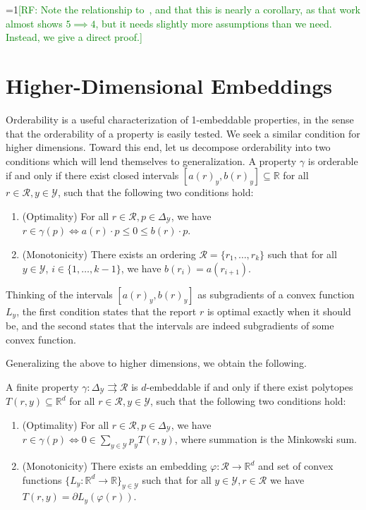 \documentclass[anon,12pt]{colt2019}
\newcommand{\Comments}{1}
\newcommand{\mynote}[2]{\ifnum\Comments=1\textcolor{#1}{#2}\fi}
\newcommand{\raf}[1]{\mynote{green}{[RF: #1]}}
\newcommand{\reals}{\mathbb{R}}
\newcommand{\simplex}{\Delta_\Y}
\newcommand{\R}{\mathcal{R}}
\newcommand{\Y}{\mathcal{Y}}
\newcommand{\toto}{\rightrightarrows}
\begin{document}
\raf{Note the relationship to~\cite{finocchiaro2018convex}, and that this is nearly a corollary, as that work almost shows $5\implies 4$, but it needs slightly more assumptions than we need.  Instead, we give a direct proof.}

\section{Higher-Dimensional Embeddings}\label{sec:general-dimensions}

Orderability is a useful characterization of 1-embeddable properties, in the sense that the orderability of a property is easily tested.
We seek a similar condition for higher dimensions.
Toward this end, let us decompose orderability into two conditions which will lend themselves to generalization.
A property $\gamma$ is orderable if and only if there exist closed intervals $[a(r)_y,b(r)_y] \subseteq \reals$ for all $r\in\R, y\in\Y$, such that the following two conditions hold:
\begin{enumerate}
\item (Optimality) For all $r\in\R, p\in\simplex$, we have $r\in \gamma(p) \iff a(r)\cdot p \leq 0 \leq b(r)\cdot p$.
\item (Monotonicity) There exists an ordering $\R=\{r_1,\ldots,r_k\}$ such that for all $y\in\Y$, $i\in\{1,\ldots,k-1\}$, we have $b(r_i) = a(r_{i+1})$.
\end{enumerate}
Thinking of the intervals $[a(r)_y,b(r)_y]$ as subgradients of a convex function $L_y$, the first condition states that the report $r$ is optimal exactly when it should be, and the second states that the intervals are indeed subgradients of some convex function.

Generalizing the above to higher dimensions, we obtain the following.
\begin{theorem}
  A finite property $\gamma:\simplex\toto\R$ is $d$-embeddable if and only if there exist polytopes $T(r,y) \subseteq \reals^d$ for all $r\in\R, y\in\Y$, such that the following two conditions hold:
  \begin{enumerate}
  \item (Optimality) For all $r\in\R, p\in\simplex$, we have $r\in \gamma(p) \iff 0 \in \sum_{y\in\Y} p_y T(r,y)$, where summation is the Minkowski sum.
  \item (Monotonicity) There exists an embedding $\varphi: \R \to \reals^d$ and set of convex functions $\{L_y:\reals^d\to\reals\}_{y\in\Y}$ such that for all $y\in\Y, r\in\R$ we have $T(r,y) = \partial L_y(\varphi(r))$.
  \end{enumerate}
\end{theorem}
\end{document}
